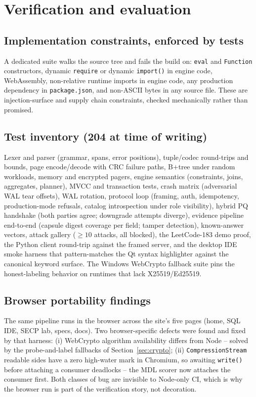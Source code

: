 \documentclass[11pt]{article}
\newcommand{\code}[1]{\texttt{#1}}
\begin{document}
\section{Verification and evaluation}
\label{sec:verification}

\subsection{Implementation constraints, enforced by tests}
\label{sec:constraints}
A dedicated suite walks the source tree and fails the build on: \code{eval}
and \code{Function} constructors, dynamic \code{require} or dynamic
\code{import()} in engine code, WebAssembly, non-relative runtime imports in
engine code, any production dependency in \code{package.json}, and
non-ASCII bytes in any source file. These are injection-surface and supply
chain constraints, checked mechanically rather than promised.

\subsection{Test inventory (204 at time of writing)}
Lexer and parser (grammar, spans, error positions), tuple/codec round-trips
and bounds, page encode/decode with CRC failure paths, B$+$tree under random
workloads, memory and encrypted pagers, engine semantics (constraints,
joins, aggregates, planner), MVCC and transaction tests, crash matrix
(adversarial WAL tear offsets), WAL rotation, protocol loop (framing,
auth, idempotency, production-mode refusals, catalog introspection under
role visibility), hybrid PQ handshake (both parties agree; downgrade
attempts diverge), evidence pipeline end-to-end (capsule digest coverage
per field; tamper detection), known-answer vectors, attack gallery
($\geq 10$ attacks, all blocked), the LeetCode-183 demo proof, the Python
client round-trip against the framed server, and the desktop IDE smoke
harness that pattern-matches the Qt syntax highlighter against the
canonical keyword surface. The Windows WebCrypto fallback suite pins the
honest-labeling behavior on runtimes that lack X25519/Ed25519.

\subsection{Browser portability findings}
The same pipeline runs in the browser across the site's five pages (home,
SQL IDE, SECP lab, specs, docs). Two browser-specific
defects were found and fixed by that harness: (i) WebCrypto algorithm
availability differs from Node -- solved by the probe-and-label fallbacks of
Section~\ref{sec:crypto}; (ii) \code{CompressionStream} readable sides have
a zero high-water mark in Chromium, so awaiting \code{write()} before
attaching a consumer deadlocks -- the MDL scorer now attaches the consumer
first. Both classes of bug are invisible to Node-only CI, which is why the
browser run is part of the verification story, not decoration.
\end{document}
